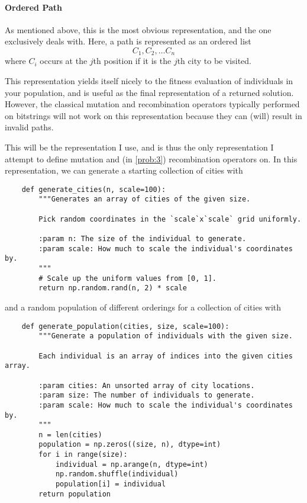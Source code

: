 \documentclass{article}
\begin{document}
\paragraph{Ordered Path}
As mentioned above, this is the most obvious representation, and the one~\cite{tsp_ea} exclusively
deals with. Here, a path is represented as an ordered list
\[C_1, C_2, \dots C_n \]
where $C_i$ occurs at the $j$th position if it is the $j$th city to be visited.

This representation yields itself nicely to the fitness evaluation of individuals in your
population, and is useful as the final representation of a returned solution. However, the
classical mutation and recombination operators typically performed on bitstrings will not work on
this representation because they can (will) result in invalid paths.

This will be the representation I use, and is thus the only representation I attempt to define
mutation and (in \autoref{prob:3}) recombination operators on. In this representation, we can
generate a starting collection of cities with

\begin{verbatim}
    def generate_cities(n, scale=100):
        """Generates an array of cities of the given size.

        Pick random coordinates in the `scale`x`scale` grid uniformly.

        :param n: The size of the individual to generate.
        :param scale: How much to scale the individual's coordinates by.
        """
        # Scale up the uniform values from [0, 1].
        return np.random.rand(n, 2) * scale
\end{verbatim}

and a random population of different orderings for a collection of cities with

\begin{verbatim}
    def generate_population(cities, size, scale=100):
        """Generate a population of individuals with the given size.

        Each individual is an array of indices into the given cities array.

        :param cities: An unsorted array of city locations.
        :param size: The number of individuals to generate.
        :param scale: How much to scale the individual's coordinates by.
        """
        n = len(cities)
        population = np.zeros((size, n), dtype=int)
        for i in range(size):
            individual = np.arange(n, dtype=int)
            np.random.shuffle(individual)
            population[i] = individual
        return population
\end{verbatim}
\end{document}

